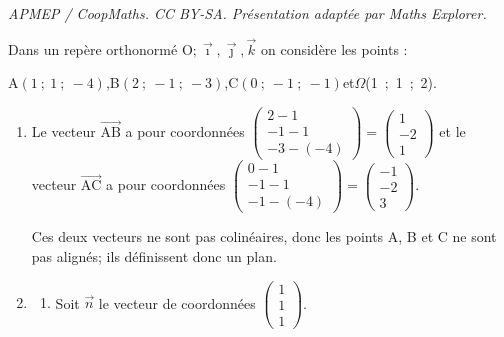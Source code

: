 \documentclass[10pt]{article}
\providecommand{\vect}[1]{\overrightarrow{#1}}
\providecommand{\vectt}[1]{\overrightarrow{\mathrm{#1}}}
\providecommand{\Oijk}{\(\mathrm{O};\vec{\imath},\vec{\jmath},\vec{k}\)}
\begin{document}
\noindent\textit{APMEP / CoopMaths. CC BY-SA. Présentation adaptée par Maths Explorer.}\par\medskip
\medskip

Dans un repère orthonormé \Oijk{} on considère les points :
\begin{center} A$(1~;~1~;~-4)$,\quad B$(2~;~-1~;~-3)$,\quad  C$(0~;~-1~;~-1)$\quad  et\quad  $\Omega$(1~;~1~;~2).\end{center}

\smallskip

\begin{enumerate}
\item
Le vecteur $\vectt{AB}$ a pour coordonnées
$\begin{pmatrix}
2-1 \\ -1-1 \\-3-(-4)
\end{pmatrix}
=
\begin{pmatrix}
1 \\ -2 \\ 1
\end{pmatrix}$
 et le vecteur $\vectt{AC}$ a pour coordonnées
$\begin{pmatrix}
0-1 \\ -1-1 \\-1-(-4)
\end{pmatrix}
=
\begin{pmatrix}
-1 \\ -2 \\ 3
\end{pmatrix}$.

Ces deux vecteurs ne sont pas colinéaires, donc les points A, B et C ne sont pas alignés; ils définissent donc un plan.
 
\item 
	\begin{enumerate}
		\item Soit  $\vect{n}$ le vecteur de coordonnées $\begin{pmatrix}1\\1\\1\end{pmatrix}$.
		


\end{enumerate}
\end{enumerate}
\end{document}
